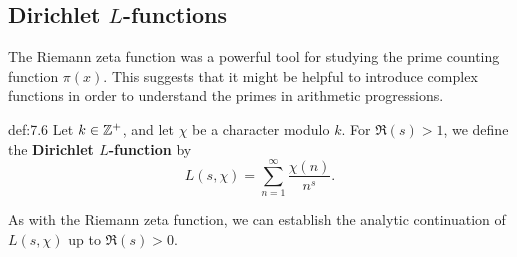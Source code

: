 \subsection{Dirichlet $L$-functions}\label{subsec:7.4}
The Riemann zeta function was a powerful tool for studying the prime counting 
function $\pi(x)$. This suggests that it might be helpful to introduce complex 
functions in order to understand the primes in arithmetic progressions. 

\begin{defn}{def:7.6}
    Let $k \in \mathbb{Z}^+$, and let $\chi$ be a character modulo $k$. For $\Re(s) > 1$, 
    we define the {\bf Dirichlet $L$-function} by 
    \[ L(s, \chi) = \sum_{n=1}^\infty \frac{\chi(n)}{n^s}. \] 
\end{defn}

As with the Riemann zeta function, we can establish the analytic continuation of 
$L(s, \chi)$ up to $\Re(s) > 0$. 

